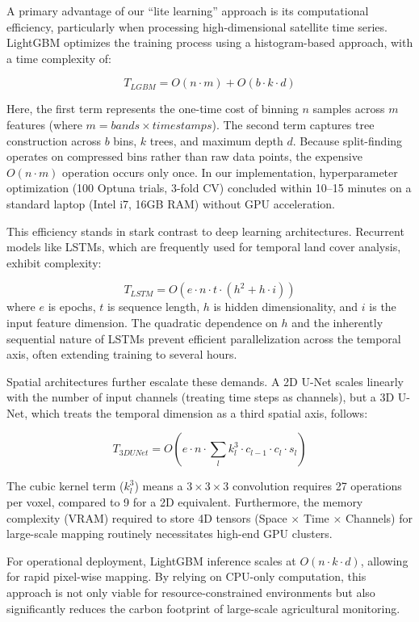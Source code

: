 \documentclass[
  journal,
  twocolumn]{IEEEtran}
\begin{document}
A primary advantage of our ``lite learning'' approach is its
computational efficiency, particularly when processing high-dimensional
satellite time series. LightGBM optimizes the training process using a
histogram-based approach, with a time complexity of:

\[T_{LGBM} = O(n \cdot m) + O(b \cdot k \cdot d)\]

Here, the first term represents the one-time cost of binning \(n\)
samples across \(m\) features (where \(m = bands \times timestamps\)).
The second term captures tree construction across \(b\) bins, \(k\)
trees, and maximum depth \(d\). Because split-finding operates on
compressed bins rather than raw data points, the expensive
\(O(n \cdot m)\) operation occurs only once. In our implementation,
hyperparameter optimization (100 Optuna trials, 3-fold CV) concluded
within 10--15 minutes on a standard laptop (Intel i7, 16GB RAM) without
GPU acceleration.

This efficiency stands in stark contrast to deep learning architectures.
Recurrent models like LSTMs, which are frequently used for temporal land
cover analysis, exhibit complexity:

\[T_{LSTM} = O(e \cdot n \cdot t \cdot (h^2 + h \cdot i))\] where \(e\)
is epochs, \(t\) is sequence length, \(h\) is hidden dimensionality, and
\(i\) is the input feature dimension. The quadratic dependence on \(h\)
and the inherently sequential nature of LSTMs prevent efficient
parallelization across the temporal axis, often extending training to
several hours.

Spatial architectures further escalate these demands. A 2D U-Net scales
linearly with the number of input channels (treating time steps as
channels), but a 3D U-Net, which treats the temporal dimension as a
third spatial axis, follows:

\[T_{3DUNet} = O(e \cdot n \cdot \sum_{l} k_l^3 \cdot c_{l-1} \cdot c_l \cdot s_l)\]

The cubic kernel term (\(k_l^3\)) means a \(3 \times 3 \times 3\)
convolution requires 27 operations per voxel, compared to 9 for a 2D
equivalent. Furthermore, the memory complexity (VRAM) required to store
4D tensors (Space \(\times\) Time \(\times\) Channels) for large-scale
mapping routinely necessitates high-end GPU clusters.

For operational deployment, LightGBM inference scales at
\(O(n \cdot k \cdot d)\), allowing for rapid pixel-wise mapping. By
relying on CPU-only computation, this approach is not only viable for
resource-constrained environments but also significantly reduces the
carbon footprint of large-scale agricultural monitoring.
\end{document}
